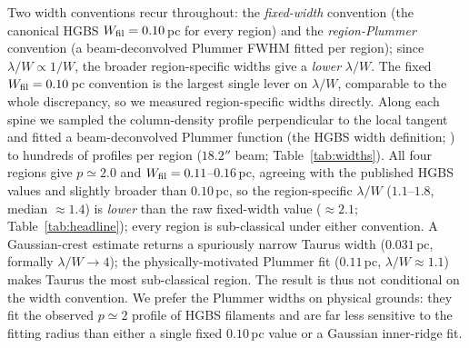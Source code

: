 \documentclass[usenatbib,twoside,twocolumn]{mnras}
\begin{document}
Two width conventions recur throughout: the \emph{fixed-width} convention (the canonical HGBS $W_{\rm fil}=0.10$\,pc for every region) and the \emph{region-Plummer} convention (a beam-deconvolved Plummer FWHM fitted per region); since $\lambda/W\propto1/W$, the broader region-specific widths give a \emph{lower} $\lambda/W$. The fixed $W_{\rm fil}=0.10$\,pc convention is the largest single lever on $\lambda/W$, comparable to the whole discrepancy, so we measured region-specific widths directly. Along each spine we sampled the column-density profile perpendicular to the local tangent and fitted a beam-deconvolved Plummer function (the HGBS width definition; \citealt{Arzoumanian2019}) to hundreds of profiles per region ($18.2''$ beam; Table~\ref{tab:widths}). All four regions give $p\simeq2.0$ and $W_{\rm fil}=0.11$--$0.16$\,pc, agreeing with the published HGBS values and slightly broader than $0.10$\,pc, so the region-specific $\lambda/W$ ($1.1$--$1.8$, median $\approx1.4$) is \emph{lower} than the raw fixed-width value ($\approx2.1$; Table~\ref{tab:headline}); every region is sub-classical under either convention. A Gaussian-crest estimate returns a spuriously narrow Taurus width ($0.031$\,pc, formally $\lambda/W\to4$); the physically-motivated Plummer fit ($0.11$\,pc, $\lambda/W\approx1.1$) makes Taurus the most sub-classical region. The result is thus not conditional on the width convention. We prefer the Plummer widths on physical grounds: they fit the observed $p\simeq2$ profile of HGBS filaments and are far less sensitive to the fitting radius than either a single fixed $0.10$\,pc value or a Gaussian inner-ridge fit.
\end{document}
